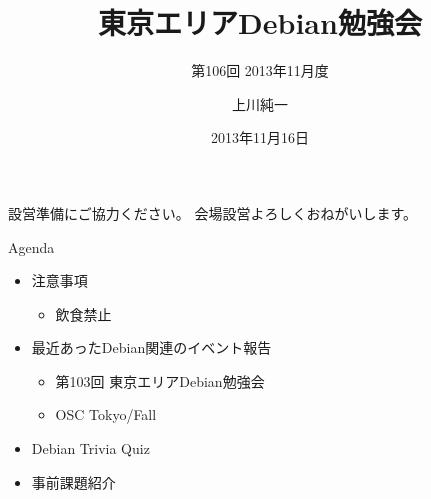 \title{東京エリアDebian勉強会}
\subtitle{第106回 2013年11月度}
\author{上川純一}
\date{2013年11月16日}



\begin{frame}
\titlepage{}
\end{frame}

\begin{frame}{設営準備にご協力ください。}
会場設営よろしくおねがいします。
\end{frame}

\begin{frame}{Agenda}
 \begin{minipage}[t]{0.45\hsize}
  \begin{itemize}
   \item 注意事項
	 \begin{itemize}
	  \item 飲食禁止
	 \end{itemize}
   \item 最近あったDebian関連のイベント報告
	 \begin{itemize}
	  \item 第103回 東京エリアDebian勉強会
	  \item OSC Tokyo/Fall
	 \end{itemize}
  \end{itemize}
 \end{minipage} 
 \begin{minipage}[t]{0.45\hsize}
  \begin{itemize}
   \item Debian Trivia Quiz
   \item 事前課題紹介
  \end{itemize}
 \end{minipage}
\end{frame}

